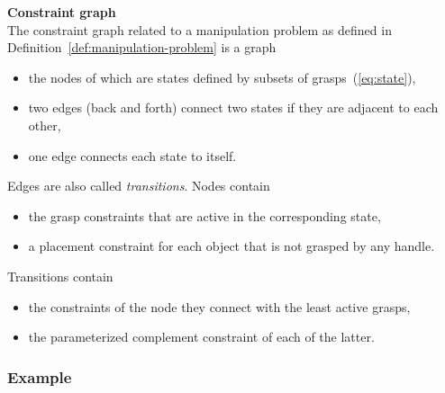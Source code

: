 \begin{definition}\label{def:constraint-graph}\textbf{Constraint graph}\\
  The constraint graph related to a manipulation problem as defined in Definition~\ref{def:manipulation-problem} is a graph
  \begin{itemize}
  \item the nodes of which are states defined by subsets of grasps~(\ref{eq:state}),
  \item two edges (back and forth) connect two states if they are adjacent to each other,
  \item one edge connects each state to itself.
  \end{itemize}
  Edges are also called \textit{transitions}.
  Nodes contain
  \begin{itemize}
  \item the grasp constraints that are active in the corresponding state,
  \item a placement constraint for each object that is not grasped by any handle.
  \end{itemize}
  Transitions contain
  \begin{itemize}
  \item the constraints of the node they connect with the least active grasps,
  \item the parameterized complement constraint of each of the latter.
  \end{itemize}
\end{definition}

\subsubsection{Example}\label{subsec:ur3-cylinder}

